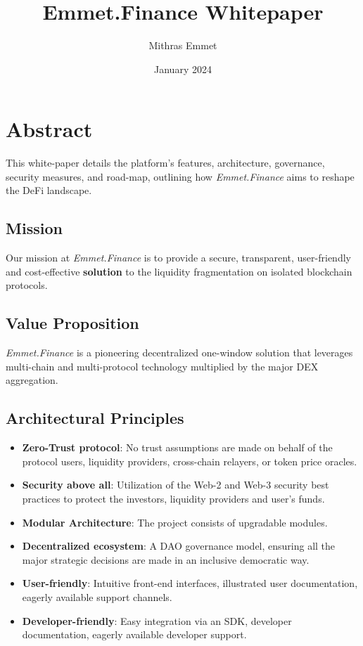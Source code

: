 \documentclass[12pt, a4paper]{article}
\title{Emmet.Finance Whitepaper}
\author{Mithras Emmet}
\date{January 2024}
\begin{document}
\maketitle

\newpage

\tableofcontents

\newpage

\section{Abstract}

This white-paper details the platform's features, architecture, governance, security measures, and road-map, outlining how \textit{Emmet.Finance} aims to reshape the DeFi landscape.

\subsection{Mission}

Our mission at \textit{Emmet.Finance} is to provide a secure, transparent, user-friendly and cost-effective \textbf{solution} to the liquidity fragmentation on isolated blockchain protocols.

\subsection{Value Proposition}

\textit{Emmet.Finance} is a pioneering decentralized one-window solution that leverages multi-chain and multi-protocol technology multiplied by the major DEX aggregation.

\subsection{Architectural Principles}

\begin{itemize}
    \item \textbf{Zero-Trust protocol}: No trust assumptions are made on behalf of the protocol users, liquidity providers, cross-chain relayers, or token price oracles.
    \item \textbf{Security above all}: Utilization of the Web-2 and Web-3 security best practices to protect the investors, liquidity providers and user's funds.
    \item \textbf{Modular Architecture}: The project consists of upgradable modules.
    \item \textbf{Decentralized ecosystem}: A DAO governance model, ensuring all the major strategic decisions are made in an inclusive democratic way.
    \item \textbf{User-friendly}: Intuitive front-end interfaces, illustrated user documentation, eagerly available support channels.
    \item \textbf{Developer-friendly}: Easy integration via an SDK, developer documentation, eagerly available developer support.
\end{itemize}
\end{document}
